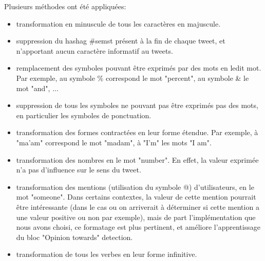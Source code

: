 \par Plusieurs méthodes ont été appliquées: \\
\begin{itemize}
  \item transformation en minuscule de tous les caractères en majuscule.
  \item suppression du hashag \#semst présent à la fin de chaque tweet, et n'apportant aucun caractère informatif au tweets.
  \item remplacement des symboles pouvant être exprimés par des mots en ledit mot. Par exemple, au symbole \% correspond le mot "percent", au symbole \& le mot "and", ...
  \item suppression de tous les symboles ne pouvant pas être exprimés pas des mots, en particulier les symboles de ponctuation.
  \item transformation des formes contractées en leur forme étendue. Par exemple, à "ma'am" correspond le mot "madam", à "I'm" les mots "I am".
  \item transformation des nombres en le mot "number". En effet, la valeur exprimée n'a pas d'influence sur le sens du tweet.
  \item transformation des mentions (utilisation du symbole @) d'utilisateurs, en le mot "someone". Dans certains contextes, la valeur de cette mention pourrait être intéressante (dans le cas ou on arriverait à déterminer si cette mention a une valeur positive ou non par exemple), mais de part l'implémentation que nous avons choisi, ce formatage est plus pertinent, et améliore l'apprentissage du bloc "Opinion towards" detection.
  \item transformation de tous les verbes en leur forme infinitive. \\
\end{itemize}

